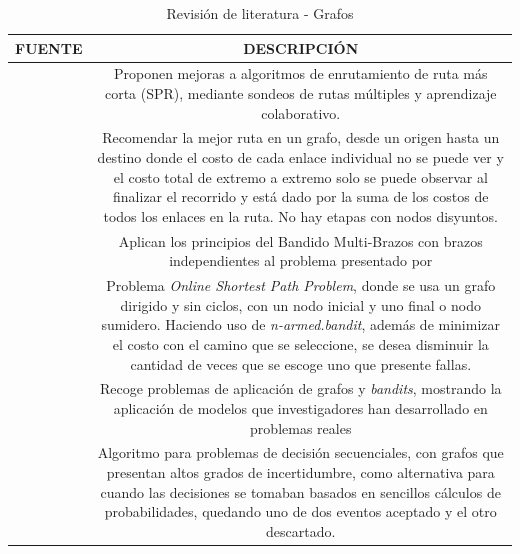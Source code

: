 \begin{table}[H] 
\caption{Revisión de literatura - Grafos}
\centering
\begin{tabular}{cc}
\textbf{FUENTE}   & \textbf{DESCRIPCIÓN}   \\ \hline
\multicolumn{1}{|l|}{\citet{zhou2019toward}} & \multicolumn{1}{p{10cm}|}{Proponen mejoras a algoritmos de enrutamiento de ruta más corta (SPR), mediante sondeos de rutas múltiples y aprendizaje colaborativo.} \\ \hline
\multicolumn{1}{|l|}{\citet{liu2011multi}}   & \multicolumn{1}{p{10cm}|}{Recomendar la mejor ruta en un grafo, desde un origen hasta un destino donde el costo de cada enlace individual no se puede ver y el costo total de extremo a extremo solo se puede observar al finalizar el recorrido y está dado por la suma de los costos de todos los enlaces en la ruta. No hay etapas con nodos disyuntos.} \\ \hline
\multicolumn{1}{|l|}{\citet{liu2012adaptive}}   & \multicolumn{1}{p{10cm}|}{Aplican los principios del Bandido Multi-Brazos con brazos independientes al problema presentado por \citet{liu2011multi}} \\ \hline
\multicolumn{1}{|l|}{\citet{AvilaCartes2018}}   & \multicolumn{1}{p{10cm}|}{Problema \textit{Online Shortest Path Problem}, donde se usa un grafo dirigido y sin ciclos, con un nodo inicial y uno final o nodo sumidero. Haciendo uso de \textit{n-armed.bandit}, además de minimizar el costo con el camino que se seleccione, se desea disminuir la cantidad de veces que se escoge uno que presente fallas.} \\ \hline
\multicolumn{1}{|l|}{\citet{valko2016bandits}}   & \multicolumn{1}{p{10cm}|}{Recoge problemas de aplicación de grafos y \textit{bandits}, mostrando la aplicación de modelos que investigadores han desarrollado en problemas reales} \\ \hline
\multicolumn{1}{|l|}{\citet{tossou2017thompson}}   & \multicolumn{1}{p{10cm}|}{Algoritmo para problemas de decisión secuenciales, con grafos que presentan altos grados de incertidumbre, como alternativa para cuando las decisiones se tomaban basados en sencillos cálculos de probabilidades, quedando uno de dos eventos aceptado y el otro descartado.} \\ \hline
\end{tabular}
\label{tab:litera}
\end{table}

